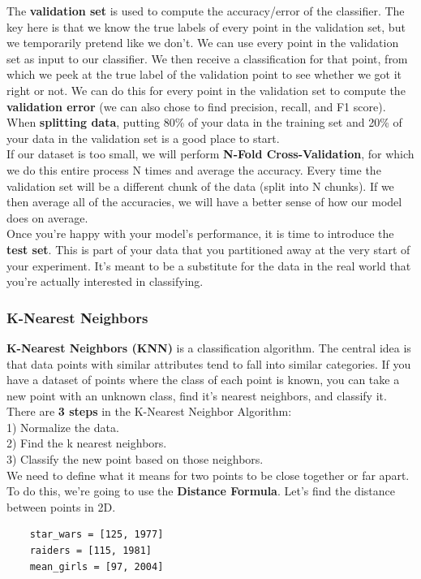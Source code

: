 \documentclass[11pt, a4paper]{article}
\begin{document}
\begin{spacing}{1.1}
	The \textbf{validation set} is used to compute the accuracy/error of the classifier. The key here is that we know the true labels of every point in the validation set, but we temporarily pretend like we don’t. We can use every point in the validation set as input to our classifier. We then receive a classification for that point, from which we peek at the true label of the validation point to see whether we got it right or not. We can do this for every point in the validation set to compute the \textbf{validation error} (we can also chose to find precision, recall, and F1 score). \vspace*{1.5mm} \\
	When \textbf{splitting data}, putting 80\% of your data in the training set and 20\% of your data in the validation set is a good place to start. \vspace*{1.5mm} \\
	If our dataset is too small, we will perform \textbf{N-Fold Cross-Validation}, for which we do this entire process N times and average the accuracy. Every time the validation set will be a different chunk of the data (split into N chunks). If we then average all of the accuracies, we will have a better sense of how our model does on average. \vspace*{1.5mm} \\
	Once you’re happy with your model’s performance, it is time to introduce the \textbf{test set}. This is part of your data that you partitioned away at the very start of your experiment. It’s meant to be a substitute for the data in the real world that you’re actually interested in classifying. \newpage

	\subsubsection{K-Nearest Neighbors}
	\textbf{K-Nearest Neighbors (KNN)} is a classification algorithm. The central idea is that data points with similar attributes tend to fall into similar categories. If you have a dataset of points where the class of each point is known, you can take a new point with an unknown class, find it’s nearest neighbors, and classify it. \vspace*{2mm} \\
	There are \textbf{3 steps} in the K-Nearest Neighbor Algorithm: \\
	\hspace*{3mm} 1) Normalize the data. \\
	\hspace*{3mm} 2) Find the k nearest neighbors. \\
	\hspace*{3mm} 3) Classify the new point based on those neighbors. \vspace*{2mm} \\
	We need to define what it means for two points to be close together or far apart. To do this, we’re going to use the \textbf{Distance Formula}. Let's find the distance between points in 2D.
	\begin{lstlisting}
	star_wars = [125, 1977]
	raiders = [115, 1981]
	mean_girls = [97, 2004]
	

\end{lstlisting}
\end{spacing}
\end{document}
